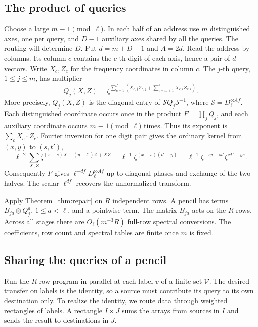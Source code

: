 \subsection{The product of queries}

Choose a large \(m\equiv1\pmod\ell\). In each half of an address use
\(m\) distinguished axes, one per query, and \(D-1\) auxiliary axes
shared by all the queries. The routing will determine \(D\). Put
\(d=m+D-1\) and \(A=2d\). Read the address by columns. Its column
\(c\) contains the \(c\)-th digit of each axis, hence a pair of
\(d\)-vectors. Write \(X_c,Z_c\) for the frequency coordinates
in column \(c\). The \(j\)-th query, \(1\le j\le m\), has multiplier
\[
 Q_j(X,Z)=\zeta^{\sum_{c=1}^{f}
 (X_{c,j}Z_{c,j}+\sum_{i=m+1}^dX_{c,i}Z_{c,i})}.
\]
More precisely, \(Q_j(X,Z)\) is the diagonal entry of
\(\mathcal S Q_j\mathcal S^{-1}\), where
\(\mathcal S=D_\ell^{\otimes Af}\).
Each distinguished coordinate occurs once in the product
\(F=\prod_j Q_j\), and each auxiliary coordinate occurs \(m\equiv1
\pmod\ell\) times. Thus its exponent is \(\sum_c X_c\cdot Z_c\).
Fourier inversion for one digit pair gives the ordinary kernel
from \((x,y)\) to \((s,t')\),
\[
 \ell^{-2}\sum_{X,Z}\zeta^{(x-s)X+(y-t')Z+XZ}
 =\ell^{-1}\zeta^{(x-s)(t'-y)}
 =\ell^{-1}\zeta^{-xy-st'}\zeta^{xt'+ys}.
\]
Consequently \(F\) gives \(\ell^{-df}D_\ell^{\otimes Af}\) up to
diagonal phases and exchange of the two halves. The scalar
\(\ell^{df}\) recovers the unnormalized transform.

Apply Theorem~\ref{thm:repair} on \(R\) independent rows. A pencil
has terms \(B_{ja}\otimes Q_j^a\), \(1\le a<\ell\), and a pointwise
term. The matrix \(B_{ja}\) acts on the \(R\) rows. Across all stages
there are \(O_\ell(m^{-3}R)\) full-row spectral conversions. The
coefficients, row count and spectral tables are finite once \(m\) is fixed.

\subsection{Sharing the queries of a pencil}

Run the \(R\)-row program in parallel at each label \(v\) of a finite
set \(\mathcal V\). The desired transfer on labels is the identity,
so a source must contribute its query to its own destination only.
To realize the identity, we route data through weighted rectangles of
labels. A rectangle \(I\times J\) sums the arrays from sources in \(I\)
and sends the result to destinations in \(J\).

